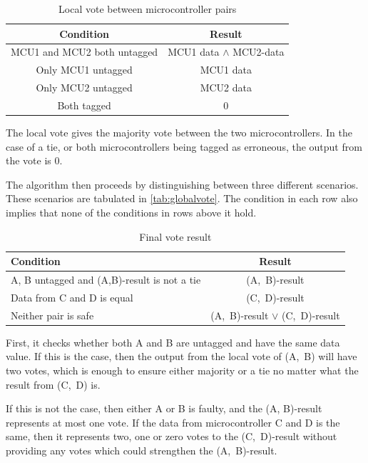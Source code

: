 \begin{table}[htbp]
  \centering
  \caption{Local vote between microcontroller pairs}
  \begin{tabular}{|c|c|}
    \hline
    \textbf{Condition} & \textbf{Result} \\ \hline
    MCU1 and MCU2 both untagged & MCU1 data $\wedge$ MCU2-data \\ \hline
    Only MCU1 untagged & MCU1 data \\ \hline
    Only MCU2 untagged & MCU2 data \\ \hline
    Both tagged   & 0 \\ \hline
  \end{tabular}
  \label{tab:localvote}
\end{table}

The local vote gives the majority vote between the two
microcontrollers. In the case of a tie, or both microcontrollers being
tagged as erroneous, the output from the vote is 0. 

The algorithm then proceeds by distinguishing between three different
scenarios. These scenarios are tabulated in
\autoref{tab:globalvote}. The condition in each row also implies that
none of the conditions in rows above it hold.

\begin{table}[htbp]
  \centering
  \caption{Final vote result}
  \begin{tabular}{|p{7cm}|c|}
    \hline
    \textbf{Condition} & \textbf{Result} \\ \hline
    A, B untagged and (A,B)-result is not a tie & (A,~B)-result \\ \hline
    Data from C and D is equal & (C,~D)-result \\ \hline
    Neither pair is safe  & (A,~B)-result $\vee$ (C,~D)-result \\ \hline
  \end{tabular}
  \label{tab:globalvote}
\end{table}

First, it checks whether both A and B are untagged and have the same
data value. If this is the case, then the output from the local vote
of (A,~B) will have two votes, which is enough to ensure either
majority or a tie no matter what the result from (C,~D) is.

If this is not the case, then either A or B is faulty, and the (A,
B)-result represents at most one vote. If the data from
microcontroller C and D is the same, then it represents two, one or
zero votes to the (C,~D)-result without providing any votes which
could strengthen the (A,~B)-result.


